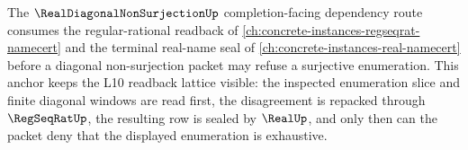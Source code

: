 The $\RealDiagonalNonSurjectionUp$ completion-facing dependency route consumes the regular-rational readback of \autoref{ch:concrete-instances-regseqrat-namecert} and the terminal real-name seal of \autoref{ch:concrete-instances-real-namecert} before a diagonal non-surjection packet may refuse a surjective enumeration. This anchor keeps the L10 readback lattice visible: the inspected enumeration slice and finite diagonal windows are read first, the disagreement is repacked through $\RegSeqRatUp$, the resulting row is sealed by $\RealUp$, and only then can the packet deny that the displayed enumeration is exhaustive.
